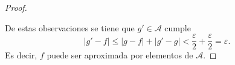 \begin{proof}
\begin{itemize}
    \end{itemize}
    De estas observaciones se tiene que  $g' \in \mathcal{A}$ cumple 
    \begin{equation}
        |g'-f| \leq |g-f| + |g'-g| 
        <
         \frac{\varepsilon}{2} + \frac{\varepsilon}{2} 
        = 
        \varepsilon.
    \end{equation}
    Es decir, $f$ puede ser aproximada por elementos de $\mathcal{A}$.
\end{proof}
